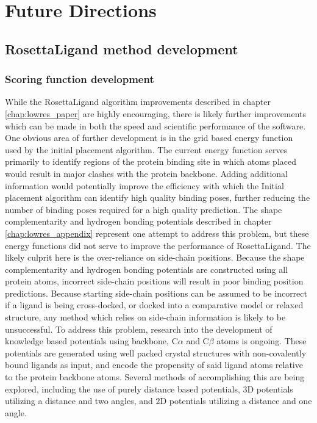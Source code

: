 \section{Future Directions}

\subsection{RosettaLigand method development}

\subsubsection{Scoring function development}
While the RosettaLigand algorithm improvements described in chapter \ref{chap:lowres_paper} are highly encouraging, there is likely further improvements which can be made in both the speed and scientific performance of the software.
One obvious area of further development is in the grid based energy function used by the initial placement algorithm.
The current energy function serves primarily to identify regions of the protein binding site in which atoms placed would result in major clashes with the protein backbone.  
Adding additional information would potentially improve the efficiency with which the Initial placement algorithm can identify high quality binding poses, further reducing the number of binding poses required for a high quality prediction.
The shape complementarity and hydrogen bonding potentials described in chapter \ref{chap:lowres_appendix} represent one attempt to address this problem, but these energy functions did not serve to improve the performance of RosettaLigand.
The likely culprit here is the over-reliance on side-chain positions.
Because the shape complementarity and hydrogen bonding potentials are constructed using all protein atoms, incorrect side-chain positions will result in poor binding position predictions.
Because starting side-chain positions can be assumed to be incorrect if a ligand is being cross-docked, or docked into a comparative model or relaxed structure, any method which relies on side-chain information is likely to be unsuccessful.
To address this problem, research into the development of knowledge based potentials using backbone, C$\alpha$ and C$\beta$ atoms is ongoing.
These potentials are generated using well packed crystal structures with non-covalently bound ligands as input, and encode the propensity of said ligand atoms relative to the protein backbone atoms.
Several methods of accomplishing this are being explored, including the use of purely distance based potentials, 3D potentials utilizing a distance and two angles, and 2D potentials utilizing a distance and one angle.

